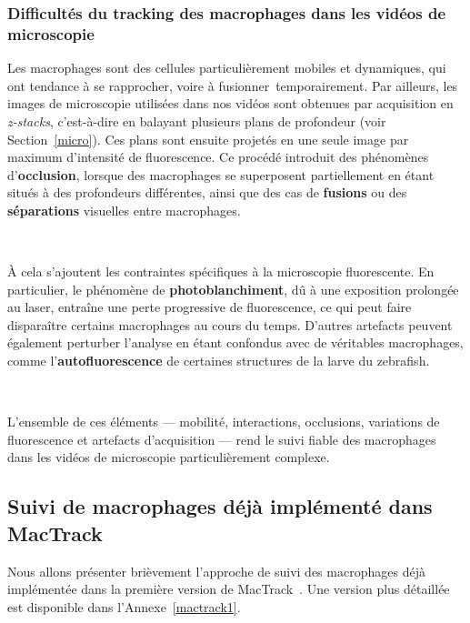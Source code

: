 \documentclass[a4paper,12pt]{report}
\begin{document}
\subsubsection{Difficultés du tracking des macrophages dans les vidéos de microscopie}
Les macrophages sont des cellules particulièrement mobiles et dynamiques, qui ont tendance à se rapprocher, voire à \og fusionner\fg\ temporairement. Par ailleurs, les images de microscopie utilisées dans nos vidéos sont obtenues par acquisition en \textit{z-stacks}, c'est-à-dire en balayant plusieurs plans de profondeur (voir Section~\ref{micro}). Ces plans sont ensuite projetés en une seule image par maximum d'intensité de fluorescence. Ce procédé introduit des phénomènes d'\textbf{occlusion}, lorsque des macrophages se superposent partiellement en étant situés à des profondeurs différentes, ainsi que des cas de \textbf{fusions} ou des \textbf{séparations} visuelles entre macrophages.

\

À cela s'ajoutent les contraintes spécifiques à la microscopie fluorescente. En particulier, le phénomène de \textbf{photoblanchiment}, dû à une exposition prolongée au laser, entraîne une perte progressive de fluorescence, ce qui peut faire disparaître certains macrophages au cours du temps. D'autres artefacts peuvent également perturber l'analyse en étant confondus avec de véritables macrophages, comme l'\textbf{autofluorescence} de certaines structures de la larve du zebrafish.

\

L'ensemble de ces éléments --- mobilité, interactions, occlusions, variations de fluorescence et artefacts d'acquisition --- rend le suivi fiable des macrophages dans les vidéos de microscopie particulièrement complexe.

\subsection{Suivi de macrophages déjà implémenté dans MacTrack}
Nous allons présenter brièvement l'approche de suivi des macrophages déjà implémentée dans la première version de MacTrack~\cite{axel}. Une version plus détaillée est disponible dans l'Annexe~\ref{mactrack1}.
\end{document}
